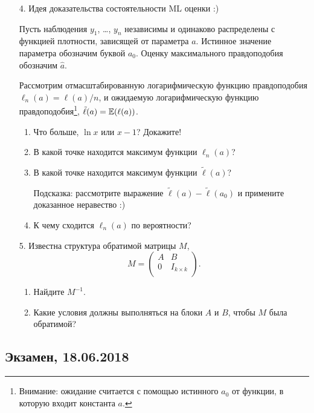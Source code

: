 \begin{enumerate}
  \item[4.] Идея доказательства состоятельности ML оценки :)

    Пусть наблюдения $y_1$, \ldots, $y_n$ независимы и одинаково распределены с функцией плотности, зависящей от параметра $a$.
    Истинное значение параметра обозначим буквой $a_0$. Оценку максимального правдоподобия обозначим $\hat a$.

    Рассмотрим отмасштабированную логарифмическую функцию правдоподобия $\ell_n(a)=\ell(a) / n$, и
    ожидаемую логарифмическую функцию правдоподобия\footnote{Внимание:
    ожидание считается с помощью истинного $a_0$ от функции, в которую входит константа $a$.},
    $\tilde \ell(a)=\mathbb{E}(\ell(a))$.
    \begin{enumerate}
      \item Что больше, $\ln x$ или $x-1$? Докажите!
      \item В какой точке находится максимум функции $\ell_n(a)$?
      \item В какой точке находится максимум функции $\tilde \ell(a)$?

	Подсказка: рассмотрите выражение $\tilde \ell(a) - \tilde \ell(a_0)$ и примените доказанное неравество :)
      \item К чему сходится $\ell_n(a)$ по вероятности?

    \end{enumerate}


  \item[5.] Известна структура обратимой матрицы $M$,
    \[
         M = \begin{pmatrix}
	   A & B \\
	   0 & I_{k\times k} \\
	 \end{pmatrix}.
    \]

    \begin{enumerate}
      \item Найдите $M^{-1}$.
      \item Какие условия должны выполняться на блоки $A$ и $B$, чтобы $M$ была обратимой?
    \end{enumerate}


\end{enumerate}


\subsection{Экзамен, 18.06.2018}

